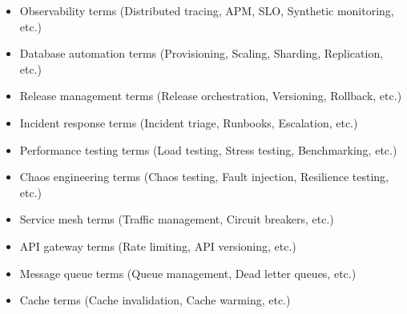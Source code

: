 \documentclass[11pt,a4paper]{article}
\begin{document}
\begin{itemize}
\item Observability terms (Distributed tracing, APM, SLO, Synthetic monitoring, etc.)
\end{itemize}

\begin{itemize}
\item Database automation terms (Provisioning, Scaling, Sharding, Replication, etc.)
\end{itemize}

\begin{itemize}
\item Release management terms (Release orchestration, Versioning, Rollback, etc.)
\end{itemize}

\begin{itemize}
\item Incident response terms (Incident triage, Runbooks, Escalation, etc.)
\end{itemize}

\begin{itemize}
\item Performance testing terms (Load testing, Stress testing, Benchmarking, etc.)
\end{itemize}

\begin{itemize}
\item Chaos engineering terms (Chaos testing, Fault injection, Resilience testing, etc.)
\end{itemize}

\begin{itemize}
\item Service mesh terms (Traffic management, Circuit breakers, etc.)
\end{itemize}

\begin{itemize}
\item API gateway terms (Rate limiting, API versioning, etc.)
\end{itemize}

\begin{itemize}
\item Message queue terms (Queue management, Dead letter queues, etc.)
\end{itemize}

\begin{itemize}
\item Cache terms (Cache invalidation, Cache warming, etc.)
\end{itemize}
\end{document}
